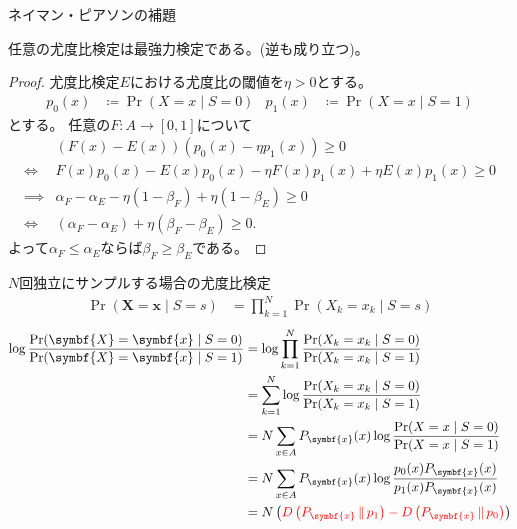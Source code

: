 \documentclass[lualatex,handout]{beamer}
\newcommand{\mycolor}[2]{%
  \begingroup
  \colorlet{currentcolor}{.}%
  \color{#1}#2%
  \color{currentcolor}%
  \endgroup
}
\newcommand{\emm}[1]{\mycolor{red}{#1}}
\newcommand\KL[2]{D\left(#1\,\|\,#2\right)}
\theoremstyle{definition}
\begin{document}
\begin{frame}{ネイマン・ピアソンの補題}
\small
\begin{lemma}[ネイマン・ピアソンの補題]
任意の尤度比検定は最強力検定である。(逆も成り立つ)。
\end{lemma}
\begin{proof}
尤度比検定$E$における尤度比の閾値を$\eta> 0$とする。
\begin{align*}
p_0(x) &\coloneq \Pr(X = x\mid S = 0)&
p_1(x) &\coloneq \Pr(X = x\mid S = 1)
\end{align*}
とする。
任意の$F\colon A\to[0,1]$について
\begin{align*}
&(F(x) - E(x)) (p_0(x) - \eta p_1(x))\ge 0\\
\iff&F(x)p_0(x) - E(x)p_0(x) - \eta F(x) p_1(x) + \eta E(x) p_1(x)\ge 0\\
\implies&\alpha_F - \alpha_E - \eta (1-\beta_F)  + \eta (1-\beta_E)\ge 0\\
\iff&(\alpha_F - \alpha_E) + \eta(\beta_F-\beta_E)\ge 0.
\end{align*}
よって$\alpha_F\le\alpha_E$ならば$\beta_F\ge\beta_E$である。
\end{proof}
\end{frame}

\begin{frame}{$N$回独立にサンプルする場合の尤度比検定}
\begin{align*}
\Pr(\symbf{X}=\symbf{x}\mid S = s) &= \prod_{k=1}^N \Pr(X_k=x_k\mid S = s)
\end{align*}
\begin{align*}
\log \frac{\Pr(\symbf{X}=\symbf{x}\mid S = 0)}{\Pr(\symbf{X}=\symbf{x}\mid S = 1)}
&=
\log \prod_{k=1}^N \frac{\Pr(X_k=x_k\mid S = 0)}{\Pr(X_k=x_k\mid S = 1)}\\
&=
\sum_{k=1}^N \log \frac{\Pr(X_k=x_k\mid S = 0)}{\Pr(X_k=x_k\mid S = 1)}\\
&=
N\sum_{x\in A} P_{\symbf{x}}(x) \log \frac{\Pr(X=x\mid S = 0)}{\Pr(X=x\mid S = 1)}\\
&=
N\sum_{x\in A} P_{\symbf{x}}(x) \log \frac{p_0(x)P_{\symbf{x}}(x)}{p_1(x)P_{\symbf{x}}(x)}\\
&=
N\left(\emm{\KL{P_{\symbf{x}}}{p_1} - \KL{P_{\symbf{x}}}{p_0}}\right)
\end{align*}
\end{frame}
\end{document}
